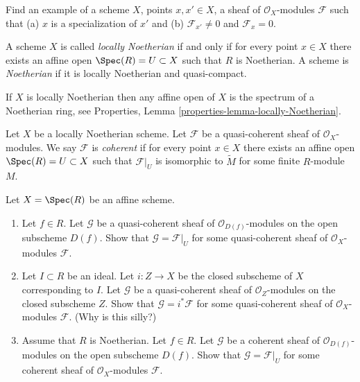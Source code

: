 \begin{exercise}
\label{exercise-O-module-specialization-points}
Find an example of a scheme $X$, points $x, x' \in X$,
a sheaf of $\mathcal{O}_X$-modules
$\mathcal{F}$ such that (a) $x$ is a specialization of $x'$ and (b)
$\mathcal{F}_{x'} \not = 0$ and $\mathcal{F}_x = 0$.
\end{exercise}

\begin{definition}
\label{definition-Noetherian-scheme}
A scheme $X$ is called {\it locally Noetherian} if and only if
for every point $x \in X$ there exists an affine open
$\Spec(R) = U \subset X$ such that $R$ is Noetherian.
A scheme is {\it Noetherian} if it is locally Noetherian and quasi-compact.
\end{definition}

\noindent
If $X$ is locally Noetherian then any affine open of $X$
is the spectrum of a Noetherian ring, see
Properties, Lemma \ref{properties-lemma-locally-Noetherian}.

\begin{definition}
\label{definition-coherent}
Let $X$ be a locally Noetherian scheme.
Let $\mathcal{F}$ be a quasi-coherent sheaf of
$\mathcal{O}_X$-modules. We say $\mathcal{F}$ is {\it coherent}
if for every point $x \in X$ there exists an affine open
$\Spec(R) = U \subset X$ such that $\mathcal{F}|_U$
is isomorphic to $\widetilde M$ for some finite $R$-module $M$.
\end{definition}

\begin{exercise}
\label{exercise-extend-quasi-coherent}
Let $X = \Spec(R)$ be an affine scheme.
\begin{enumerate}
\item Let $f \in R$. Let $\mathcal{G}$ be a
quasi-coherent sheaf of $\mathcal{O}_{D(f)}$-modules
on the open subscheme $D(f)$.
Show that $\mathcal{G} = \mathcal{F}|_U$ for some
quasi-coherent sheaf of $\mathcal{O}_X$-modules
$\mathcal{F}$.
\item Let $I \subset R$ be an ideal.
Let $i : Z \to X$ be the closed subscheme of $X$ corresponding
to $I$. Let $\mathcal{G}$ be a
quasi-coherent sheaf of $\mathcal{O}_Z$-modules
on the closed subscheme $Z$.
Show that $\mathcal{G} = i^*\mathcal{F}$ for some
quasi-coherent sheaf of $\mathcal{O}_X$-modules $\mathcal{F}$.
(Why is this silly?)
\item Assume that $R$ is Noetherian.
Let $f \in R$. Let $\mathcal{G}$ be a
coherent sheaf of $\mathcal{O}_{D(f)}$-modules
on the open subscheme $D(f)$.
Show that $\mathcal{G} = \mathcal{F}|_U$ for some
coherent sheaf of $\mathcal{O}_X$-modules $\mathcal{F}$.
\end{enumerate}
\end{exercise}

